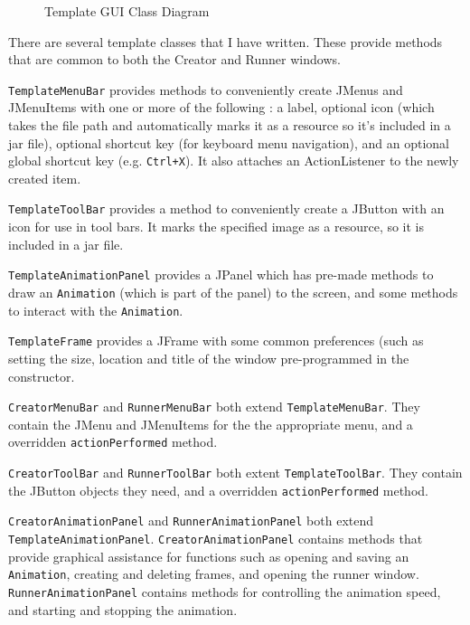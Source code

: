 \documentclass[a4paper, 11pt]{article}
\begin{document}
\begin{figure}[H]
\centering
\caption{Template GUI Class Diagram}
\label{TemplateClassDiagram}
\end{figure}

There are several template classes that I have written. These provide methods that are common to both the Creator and Runner windows.

\vspace{\baselineskip}

\texttt{TemplateMenuBar} provides methods to conveniently create JMenus and JMenuItems with one or more of the following : a label, optional icon (which takes the file path and automatically marks it as a resource so it's included in a jar file), optional shortcut key (for keyboard menu navigation), and an optional global shortcut key (e.g. \texttt{Ctrl+X}). It also attaches an ActionListener to the newly created item.

\texttt{TemplateToolBar} provides a method to conveniently create a JButton with an icon for use in tool bars. It marks the specified image as a resource, so it is included in a jar file.

\texttt{TemplateAnimationPanel} provides a JPanel which has pre-made methods to draw an \texttt{Animation} (which is part of the panel) to the screen, and some methods to interact with the \texttt{Animation}.

\texttt{TemplateFrame} provides a JFrame with some common preferences (such as setting the size, location and title of the window pre-programmed in the constructor.

\vspace{\baselineskip}

\texttt{CreatorMenuBar} and \texttt{RunnerMenuBar} both extend \texttt{TemplateMenuBar}. They contain the JMenu and JMenuItems for the the appropriate menu, and a overridden \texttt{actionPerformed} method.

\texttt{CreatorToolBar} and \texttt{RunnerToolBar} both extent \texttt{TemplateToolBar}. They contain the JButton objects they need, and a overridden \texttt{actionPerformed} method.

\texttt{CreatorAnimationPanel} and \texttt{RunnerAnimationPanel} both extend \texttt{TemplateAnimationPanel}. \texttt{CreatorAnimationPanel} contains methods that provide graphical assistance for functions such as opening and saving an \texttt{Animation}, creating and deleting frames, and opening the runner window. \texttt{RunnerAnimationPanel} contains methods for controlling the animation speed, and starting and stopping the animation.
\end{document}
